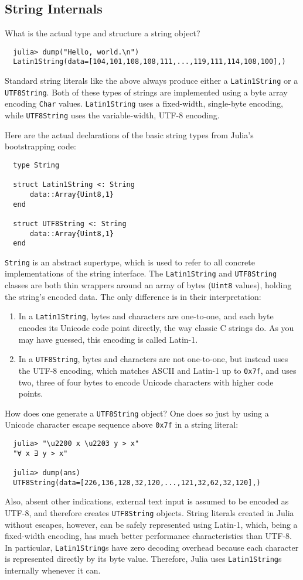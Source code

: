 \documentclass{article}
\begin{document}
\subsection{String Internals}

What is the actual type and structure a string object?
\begin{verbatim}
  julia> dump("Hello, world.\n")
  Latin1String(data=[104,101,108,108,111,...,119,111,114,108,100],)
\end{verbatim}
Standard string literals like the above always produce either a \verb|Latin1String| or a \verb|UTF8String|.
Both of these types of strings are implemented using a byte array encoding \verb|Char| values.
\verb|Latin1String| uses a fixed-width, single-byte encoding, while \verb|UTF8String| uses the variable-width, UTF-8 encoding.

Here are the actual declarations of the basic string types from Julia's bootstrapping code:
\begin{verbatim}
  type String

  struct Latin1String <: String
      data::Array{Uint8,1}
  end

  struct UTF8String <: String
      data::Array{Uint8,1}
  end
\end{verbatim}
\verb|String| is an abstract supertype, which is used to refer to all concrete implementations of the string interface.
The \verb|Latin1String| and \verb|UTF8String| classes are both thin wrappers around an array of bytes (\verb|Uint8| values), holding the string's encoded data.
The only difference is in their interpretation:
\begin{enumerate}
\item In a \verb|Latin1String|, bytes and characters are one-to-one, and each byte encodes its Unicode code point directly, the way classic C strings do.
As you may have guessed, this encoding is called Latin-1.
\item In a \verb|UTF8String|, bytes and characters are not one-to-one, but instead uses the UTF-8 encoding, which matches ASCII and Latin-1 up to \verb|0x7f|, and uses two, three of four bytes to encode Unicode characters with higher code points.
\end{enumerate}
How does one generate a \verb|UTF8String| object?
One does so just by using a Unicode character escape sequence above \verb|0x7f| in a string literal:
\begin{verbatim}
  julia> "\u2200 x \u2203 y > x"
  "∀ x ∃ y > x"

  julia> dump(ans)
  UTF8String(data=[226,136,128,32,120,...,121,32,62,32,120],)
\end{verbatim}
Also, absent other indications, external text input is assumed to be encoded as UTF-8, and therefore creates \verb|UTF8String| objects.
String literals created in Julia without escapes, however, can be safely represented using Latin-1, which, being a fixed-width encoding, has much better performance characteristics than UTF-8.
In particular, \verb|Latin1String|s have zero decoding overhead because each character is represented directly by its byte value.
Therefore, Julia uses \verb|Latin1String|s internally whenever it can.
\end{document}
